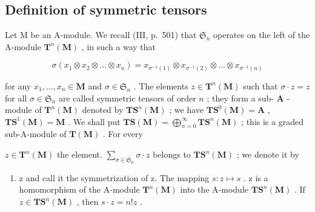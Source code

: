 \subsection{Definition of symmetric tensors}

Let M be an A-module. We recall (III, p.~501) that \(\mathfrak{S}_n\) operates on the left of the A-module \(\mathbf{T}^n (\mathbf{M})\) , in such a way that

\[
\sigma \left(x _ {1} \otimes x _ {2} \otimes \dots \otimes x _ {n}\right) = x _ {\sigma^ {- 1} (1)} \otimes x _ {\sigma^ {- 1} (2)} \otimes \dots \otimes x _ {\sigma^ {- 1} (n)}
\]

for any \(x_{1},\ldots,x_{n}\in\mathbf{M}\) and \(\sigma\in\mathfrak{S}_{n}\) . The elements \(z\in\mathbf{T}^{n}(\mathbf{M})\) such that \(\sigma\cdot z=z\) for all \(\sigma\in\mathfrak{S}_{n}\) are called symmetric tensors of order \(n\) ; they form a sub- \(\mathbf{A}\) -module of \(\mathbf{T}^{n}(\mathbf{M})\) denoted by \(\mathbf{T}\mathbf{S}^{n}(\mathbf{M})\) ; we have \(\mathbf{T}\mathbf{S}^{0}(\mathbf{M})=\mathbf{A}\) , \(\mathbf{T}\mathbf{S}^{1}(\mathbf{M})=\mathbf{M}\) . We shall put \(\mathbf{T}\mathbf{S}(\mathbf{M}) = \bigoplus_{n=0}^{\infty} \mathbf{T}\mathbf{S}^{n}(\mathbf{M})\) ; this is a graded sub-A-module of \(\mathbf{T}(\mathbf{M})\) . For every

\(z \in \mathbf{T}^n(\mathbf{M})\) the element. \(\sum_{\sigma \in \mathfrak{S}_n} \sigma \cdot z\) belongs to \(\mathbf{T}\mathbf{S}^n(\mathbf{M})\) ; we denote it by

\begin{enumerate}
\def\labelenumi{\alph{enumi}.}
\setcounter{enumi}{18}
\tightlist
\item
  z and call it the symmetrization of z. The mapping \(s: z \mapsto s\) . z is a homomorphism of the A-module \(\mathbf{T}^{n}(\mathbf{M})\) into the A-module \(\mathbf{T}\mathbf{S}^{n}(\mathbf{M})\) . If \(z \in \mathbf{T}\mathbf{S}^{n}(\mathbf{M})\) , then \(s \cdot z = n! z\) .
\end{enumerate}

